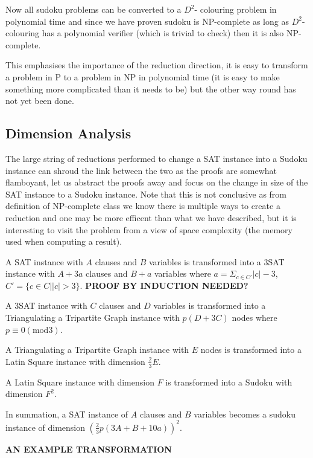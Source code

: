 \documentclass[a4paper,11pt]{report}
\newcounter{col}
\begin{document}
Now all sudoku problems can be converted to a $D^2$- colouring problem in polynomial time and since we have proven sudoku is NP-complete as long as $D^2$- colouring has a polynomial verifier (which is trivial to check) then it is also NP-complete.  

This emphasises the importance of the reduction direction, it is easy to transform a problem in P to a problem in NP in polynomial time (it is easy to make something more complicated than it needs to be) but the other way round has not yet been done. 


\subsection{Dimension Analysis}

The large string of reductions performed to change a SAT instance into a Sudoku instance can shroud the link between the two as the proofs are somewhat flamboyant, let us abstract the proofs away and focus on the change in size of the SAT instance to a Sudoku instance. Note that this is not conclusive as from definition of NP-complete class we know there is multiple ways to create a reduction and one may be more efficent than what we have described, but it is interesting to visit the problem from a view of space complexity (the memory used when computing a result).

A SAT instance with $A$ clauses and $B$ variables is transformed into a 3SAT instance with $A + 3a$ clauses and $B+a$ variables where $a=\Sigma_{c\in C'}|c|-3$, $C'=\{c\in C | |c|>3\}$. \textbf{PROOF BY INDUCTION NEEDED?}

A 3SAT instance with $C$ clauses and $D$ variables is transformed into a Triangulating a Tripartite Graph instance with $p(D+3C)$ nodes where $p\equiv 0 (\text{mod}3)$.

A Triangulating a Tripartite Graph instance with $E$ nodes is transformed into a Latin Square instance with dimension $\frac{2}{3}E$.

A Latin Square instance with dimension $F$ is transformed into a Sudoku with dimension $F^2$.

In summation, a SAT instance of $A$ clauses and $B$ variables becomes a sudoku instance of dimension $(\frac{2}{3}p(3A+B+10a))^2 $.

\textbf{AN EXAMPLE TRANSFORMATION}

\end{document}
